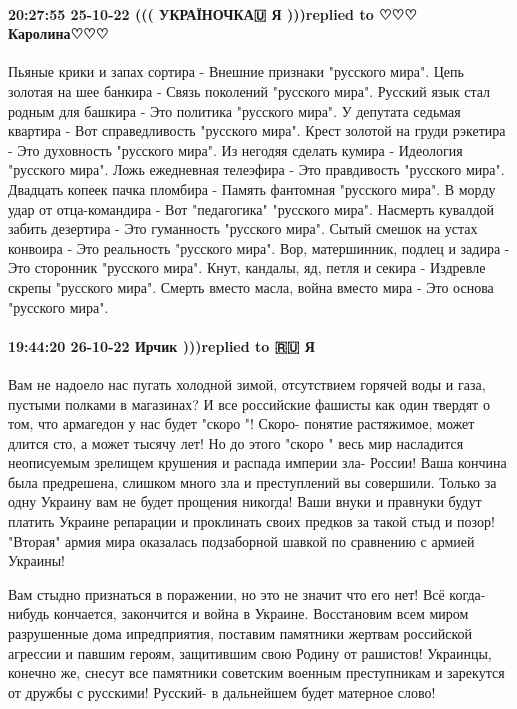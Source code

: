 \paragraph{20:27:55 25-10-22 ((( УКРАЇНОЧКА🇺 Я )))replied to ♡♡♡ Каролина♡♡♡}

Пьяные крики и запах сортира -
Внешние признаки "русского мира".
Цепь золотая на шее банкира -
Связь поколений "русского мира".
Русский язык стал родным для башкира -
Это политика "русского мира".
У депутата седьмая квартира -
Вот справедливость "русского мира".
Крест золотой на груди рэкетира -
Это духовность "русского мира".
Из негодяя сделать кумира -
Идеология "русского мира".
Ложь ежедневная телеэфира -
Это правдивость "русского мира".
Двадцать копеек пачка пломбира -
Память фантомная "русского мира".
В морду удар от отца-командира -
Вот "педагогика" "русского мира".
Насмерть кувалдой забить дезертира -
Это гуманность "русского мира".
Сытый смешок на устах конвоира -
Это реальность "русского мира".
Вор, матершинник, подлец и задира -
Это сторонник "русского мира".
Кнут, кандалы, яд, петля и секира -
Издревле скрепы "русского мира".
Смерть вместо масла, война вместо мира -
Это основа "русского мира".

\paragraph{19:44:20 26-10-22 Ирчик )))replied to 🇷🇺 Я}

Вам не надоело нас пугать холодной зимой, отсутствием горячей воды и газа,
пустыми полками в магазинах? И все российские фашисты как один твердят о том,
что армагедон у нас будет "скоро "! Скоро- понятие растяжимое, может длится
сто, а может тысячу лет! Но до этого "скоро " весь мир насладится неописуемым
зрелищем крушения и распада империи зла- России! Ваша кончина была предрешена,
слишком много зла и преступлений вы совершили. Только за одну Украину вам не
будет прощения никогда! Ваши внуки и правнуки будут платить Украине репарации и
проклинать своих предков за такой стыд и позор! "Вторая" армия мира оказалась
подзаборной шавкой по сравнению с армией Украины!

Вам стыдно признаться в поражении, но это не значит что его нет! Всё
когда-нибудь кончается, закончится и война в Украине. Восстановим всем миром
разрушенные дома ипредприятия, поставим памятники жертвам российской агрессии и
павшим героям, защитившим свою Родину от рашистов! Украинцы, конечно же, снесут
все памятники советским военным преступникам и зарекутся от дружбы с русскими!
Русский- в дальнейшем будет матерное слово!

